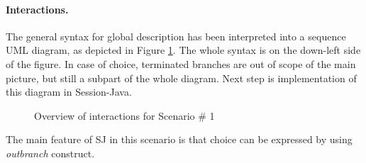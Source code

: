 \documentclass{llncs}
\begin{document}
\paragraph{Interactions.} The general syntax for global description has been interpreted into a sequence UML diagram, as depicted in Figure \ref{fig:interaction-overview-sc1}. The whole syntax is on the down-left side of the figure. In case of choice, terminated branches are out of scope of the main picture, but still a subpart of the whole diagram. Next step is implementation of this diagram in Session-Java.

\begin{figure}[ht]
\centering
{}
\caption{Overview of interactions for Scenario \# 1}
\label{fig:interaction-overview-sc1}
\end{figure}

The main feature of SJ in this scenario is that choice can be expressed by using \textit{outbranch} construct.
\end{document}
